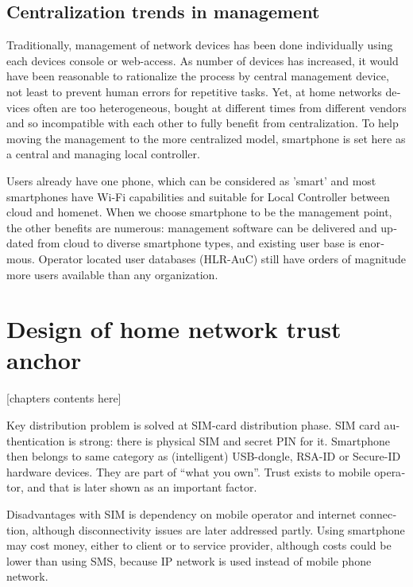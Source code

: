 \documentclass[12pt,a4paper,english]{tutthesis}
\begin{document}
\begin{otherlanguage}{english}
\section{Centralization trends in management}
\label{sec-3-2}

Traditionally, management of network devices has been done
individually using each devices console or web-access.  As number of
devices has increased, it would have been reasonable to rationalize
the process by central management device, not least to prevent human
errors for repetitive tasks.  Yet, at home networks devices often are
too heterogeneous, bought at different times from different vendors
and so incompatible with each other to fully benefit from
centralization. To help moving the management to the more centralized
model, smartphone is set here as a central and managing local
controller.


Users already have one phone, which can be considered as
'smart' and most smartphones have Wi-Fi capabilities and suitable for 
Local Controller between cloud and homenet.
When we choose smartphone to be the management point, the other benefits are
numerous:  management software can be delivered and
updated from cloud to diverse smartphone types, and existing user
base is enormous.
Operator located user databases (HLR-AuC) still have orders of
magnitude more users available than any organization. 



\chapter{Design of home network trust anchor}
\label{sec-4}




[chapters contents here]

Key distribution problem is solved at SIM-card distribution phase.
SIM card authentication is strong: there is physical SIM and secret PIN for it.
Smartphone then belongs to same category as (intelligent) USB-dongle,
RSA-ID or Secure-ID hardware devices.  They are part of ``what you own''.
Trust exists to mobile operator, and that is later shown as an
important factor. 



Disadvantages with SIM is dependency on mobile operator and internet
connection, although disconnectivity issues are later addressed partly.
Using smartphone may cost money, either to client or to service
provider, although costs could be lower than using SMS, because 
IP network is used instead of mobile
phone network.



\end{otherlanguage}
\end{document}
